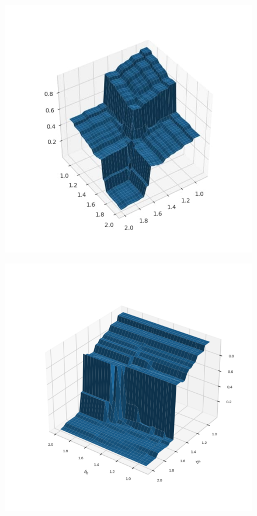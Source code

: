 \documentclass[12pt]{article}
\begin{document}
    \begin{figure}[H]
         \centering
         \begin{minipage}{.45\linewidth}
          \includegraphics[width=0.95\columnwidth, keepaspectratio=True]{DoubleField/3d.jpg}
         \label{fig:3d}
        \end{minipage}
        \hspace{.05\linewidth}
        \begin{minipage}{.45\linewidth}
          \includegraphics[width=0.95\columnwidth, keepaspectratio=True]{DoubleField/3df1.png}
         \label{fig:3df1}
        \end{minipage}
    \end{figure}
\end{document}
